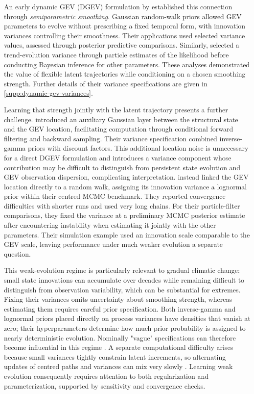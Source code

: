 \documentclass[11pt,a4paper]{article}
\begin{document}
	An early dynamic GEV (DGEV) formulation by \citet{gaetan2004} established this connection through \emph{semiparametric smoothing}. Gaussian random-walk priors allowed GEV parameters to evolve without prescribing a fixed temporal form, with innovation variances controlling their smoothness. Their applications used selected variance values, assessed through posterior predictive comparisons. Similarly, \citet{fearnhead2010} selected a trend-evolution variance through particle estimates of the likelihood before conducting Bayesian inference for other parameters. These analyses demonstrated the value of flexible latent trajectories while conditioning on a chosen smoothing strength. Further details of their variance specifications are given in \cref{supp:dynamic-gev-variances}.
	
	Learning that strength jointly with the latent trajectory presents a further challenge. \citet{huerta2007} introduced an auxiliary Gaussian layer between the structural state and the GEV location, facilitating computation through conditional forward filtering and backward sampling. Their variance specification combined inverse-gamma priors with discount factors. This additional location noise is unnecessary for a direct DGEV formulation and introduces a variance component whose contribution may be difficult to distinguish from persistent state evolution and GEV observation dispersion, complicating interpretation. \citet{wei2017} instead linked the GEV location directly to a random walk, assigning its innovation variance a lognormal prior within their centred MCMC benchmark. They reported convergence difficulties with shorter runs and used very long chains. For their particle-filter comparisons, they fixed the variance at a preliminary MCMC posterior estimate after encountering instability when estimating it jointly with the other parameters. Their simulation example used an innovation scale comparable to the GEV scale, leaving performance under much weaker evolution a separate question.
	
	This weak-evolution regime is particularly relevant to gradual climatic change: small state innovations can accumulate over decades while remaining difficult to distinguish from observation variability, which can be substantial for extremes. Fixing their variances omits uncertainty about smoothing strength, whereas estimating them requires careful prior specification. Both inverse-gamma and lognormal priors placed directly on process variances have densities that vanish at zero; their hyperparameters determine how much prior probability is assigned to nearly deterministic evolution. Nominally "vague" specifications can therefore become influential in this regime \citep{gelman2006}. A separate computational difficulty arises because small variances tightly constrain latent increments, so alternating updates of centred paths and variances can mix very slowly \citep{papaspiliopoulos2007,fearnhead_sherlock_2026}. Learning weak evolution consequently requires attention to both regularization and parameterization, supported by sensitivity and convergence checks.
	
\end{document}
